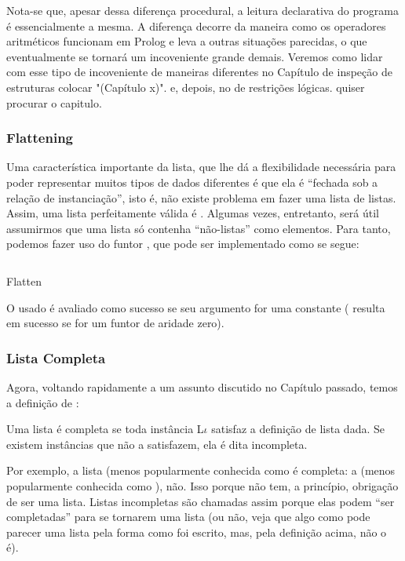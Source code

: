 \documentclass{article}
\begin{document}
Nota-se que, apesar dessa diferença procedural, a leitura declarativa
do programa é essencialmente a mesma. A diferença decorre da maneira
como os operadores aritméticos funcionam em Prolog e leva a outras
situações parecidas, o que eventualmente se tornará um incoveniente
grande demais. Veremos como lidar com esse tipo de incoveniente de
maneiras diferentes no Capítulo de inspeção de estruturas %
colocar "(Capítulo x)".  e, depois, no de restrições
lógicas. %
quiser procurar o capitulo.

\subsubsection{Flattening}

Uma característica importante da lista, que lhe dá a flexibilidade
necessária para poder representar muitos tipos de dados diferentes é
que ela é ``fechada sob a relação de instanciação'', isto é, não
existe problema em fazer uma lista de listas. Assim, uma lista
perfeitamente válida é \codigo{[[[a,b],c],[]]}. Algumas vezes,
entretanto, será útil assumirmos que uma lista  só contenha
``não-listas'' como elementos. Para tanto, podemos fazer uso do funtor
, que pode ser implementado como se segue:

    \begin{listing}
\inputminted{prolog}{../Exemplos/Cap3/prog3_flatten.pl}
\caption{Flatten}\label{lst:flatten}
    \end{listing}

\noindent O  usado é avaliado como sucesso se seu
argumento for uma constante ( resulta em sucesso se
 for um funtor de aridade zero).


\subsubsection{Lista Completa}

Agora, voltando rapidamente a um assunto discutido no Capítulo
passado, temos a definição de :

\begin{definition} Uma lista  é completa se toda instância
  L$\iota$ satisfaz a definição de lista dada. Se existem instâncias
  que não a satisfazem, ela é dita incompleta. 
\end{definition}

Por exemplo, a lista \codigo{[a,b,c]} (menos popularmente conhecida
como   é completa: a
\codigo{[a,b|Xs]} (menos popularmente conhecida como 
), não. Isso porque  não tem, a princípio,
obrigação de ser uma lista. Listas incompletas são chamadas assim
porque elas podem ``ser completadas'' para se tornarem uma lista (ou
não, veja que algo como \codigo{[a|b]} pode parecer uma lista pela
forma como foi escrito, mas, pela definição acima, não o é).
\end{document}
